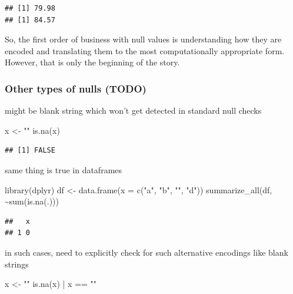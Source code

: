 \documentclass[
]{krantz}
\makeatletter
\newenvironment{Shaded}{\begin{snugshade}}{\end{snugshade}}
\newcommand{\AttributeTok}[1]{\textcolor[rgb]{0.61,0.61,0.61}{#1}}
\newcommand{\FunctionTok}[1]{\textcolor[rgb]{0,0,0}{#1}}
\newcommand{\NormalTok}[1]{#1}
\newcommand{\OtherTok}[1]{\textcolor[rgb]{0.37,0.37,0.37}{#1}}
\newcommand{\SpecialCharTok}[1]{\textcolor[rgb]{0,0,0}{#1}}
\newcommand{\StringTok}[1]{\textcolor[rgb]{0.5,0.5,0.5}{#1}}
\newenvironment{kframe}{%
\medskip{}
\setlength{\fboxsep}{.8em}
 \def\at@end@of@kframe{}%
 \ifinner\ifhmode%
  \def\at@end@of@kframe{\end{minipage}}%
  \begin{minipage}{\columnwidth}%
 \fi\fi%
 \def\FrameCommand##1{\hskip\@totalleftmargin \hskip-\fboxsep
 \colorbox{shadecolor}{##1}\hskip-\fboxsep
     \hskip-\linewidth \hskip-\@totalleftmargin \hskip\columnwidth}%
 \MakeFramed {\advance\hsize-\width
   \@totalleftmargin\z@ \linewidth\hsize
   \@setminipage}}%
 {\par\unskip\endMakeFramed%
 \at@end@of@kframe}
\renewenvironment{Shaded}{\begin{kframe}}{\end{kframe}}
\makeatother
\begin{document}
\begin{verbatim}
## [1] 79.98
## [1] 84.57
\end{verbatim}

So, the first order of business with null values is understanding how they are encoded and translating them to the most computationally appropriate form. However, that is only the beginning of the story.

\hypertarget{other-types-of-nulls-todo}{%
\subsubsection{Other types of nulls (TODO)}\label{other-types-of-nulls-todo}}

might be blank string which won't get detected in standard null checks

\begin{Shaded}
\begin{Highlighting}[]
\NormalTok{x }\OtherTok{\textless{}{-}} \StringTok{""}
\FunctionTok{is.na}\NormalTok{(x)}
\end{Highlighting}
\end{Shaded}

\begin{verbatim}
## [1] FALSE
\end{verbatim}

same thing is true in dataframes

\begin{Shaded}
\begin{Highlighting}[]
\FunctionTok{library}\NormalTok{(dplyr)}
\NormalTok{df }\OtherTok{\textless{}{-}} \FunctionTok{data.frame}\NormalTok{(}\AttributeTok{x =} \FunctionTok{c}\NormalTok{(}\StringTok{"a"}\NormalTok{, }\StringTok{"b"}\NormalTok{, }\StringTok{""}\NormalTok{, }\StringTok{"d"}\NormalTok{))}
\FunctionTok{summarize\_all}\NormalTok{(df, }\SpecialCharTok{\textasciitilde{}}\FunctionTok{sum}\NormalTok{(}\FunctionTok{is.na}\NormalTok{(.)))}
\end{Highlighting}
\end{Shaded}

\begin{verbatim}
##   x
## 1 0
\end{verbatim}

in such cases, need to explicitly check for such alternative encodings like blank strings

\begin{Shaded}
\begin{Highlighting}[]
\NormalTok{x }\OtherTok{\textless{}{-}} \StringTok{""}
\FunctionTok{is.na}\NormalTok{(x) }\SpecialCharTok{|}\NormalTok{ x }\SpecialCharTok{==} \StringTok{""}
\end{Highlighting}
\end{Shaded}
\end{document}
